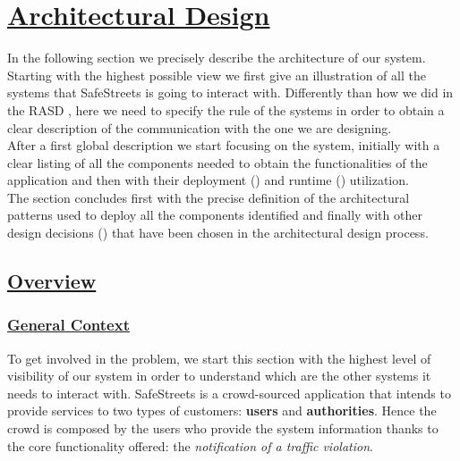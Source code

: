 \section[Architectural Design]{\hyperlink{toc}{Architectural Design}}
	\label{sec:architecturalDesign}
	
	In the following section we precisely describe the architecture of our system. Starting with the highest possible view we first give an illustration of all the systems that SafeStreets is going to interact with. Differently than how we did in the RASD \cite{RASD}, here we need to specify the rule of the systems in order to obtain a clear description of the communication with the one we are designing.\\
	
	After a first global description we start focusing on the system, initially with a clear listing of all the components needed to obtain the functionalities of the application and then with their deployment () and runtime () utilization.\\
	
	The section concludes first with the precise definition of the architectural patterns used to deploy all the components identified and finally with other design decisions () that have been chosen in the architectural design process.	
	
	\subsection[Overview]{\hyperlink{toc}{Overview}}
		\label{sec:overview}
		
		\subsubsection[General Context]{\hyperlink{toc}{General Context}}
			\label{sec:generalContext}
			
			To get involved in the problem, we start this section with the highest level of visibility of our system in order to understand which are the other systems it needs to interact with. SafeStreets is a crowd-sourced application that intends to provide services to two types of customers: \textbf{users} and \textbf{authorities}. Hence the crowd is composed by the users who provide the system information thanks to the core functionality offered: the \emph{notification of a traffic violation}.\\
			

